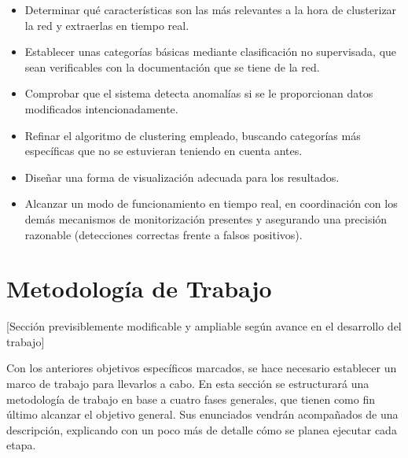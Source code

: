 \begin{itemize}

\item Determinar qué características son las más relevantes a la hora de clusterizar la red y extraerlas en tiempo real.

\item Establecer unas categorías básicas mediante clasificación no supervisada, que sean verificables con la documentación que se tiene de la red.

\item Comprobar que el sistema detecta anomalías si se le proporcionan datos modificados intencionadamente.

\item Refinar el algoritmo de clustering empleado, buscando categorías más específicas que no se estuvieran teniendo en cuenta antes.

\item Diseñar una forma de visualización adecuada para los resultados.

\item Alcanzar un modo de funcionamiento en tiempo real, en coordinación con los demás mecanismos de monitorización presentes y asegurando una precisión razonable (detecciones correctas frente a falsos positivos).

\end{itemize}

\section{Metodología de Trabajo}\label{sec:metodologia}

[Sección previsiblemente modificable y ampliable según avance en el desarrollo del trabajo]

Con los anteriores objetivos específicos marcados, se hace necesario establecer un marco de trabajo para llevarlos a cabo.
En esta sección se estructurará una metodología de trabajo en base a cuatro fases generales, que tienen como fin último alcanzar el objetivo general.
Sus enunciados vendrán acompañados de una descripción, explicando con un poco más de detalle cómo se planea ejecutar cada etapa.

